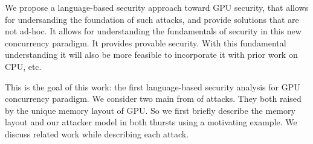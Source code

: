 We propose a language-based security approach toward GPU security, that allows for undersanding the foundation of such attacks, and provide solutions that are not ad-hoc.
%
It allows for understanding the fundamentals of security in this new concurrency paradigm.
%
It provides provable security.
%
With this fundamental understanding it will also be more feasible to incorporate it with prior work on CPU, etc.


This is the goal of this work: the first language-based security analysis for GPU concurrency paradigm.
%
We consider two main from of attacks.
%
They both raised by the unique memory layout of GPU.
%
So we first briefly describe the memory layout and our attacker model in both thursts using a motivating example.
%
We discuss related work while describing each attack.










